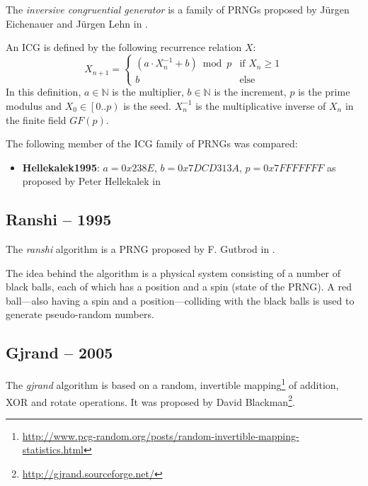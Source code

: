     The \emph{inversive congruential generator} is a family of PRNGs proposed by Jürgen Eichenauer and Jürgen Lehn in \cite{Eichenauer:1986}.

    An ICG is defined by the following recurrence relation $X$:
    \begin{equation*}
        X_{n + 1} = \begin{cases}
                        \left(a \cdot X_n^{-1} + b\right) \bmod p & \text{if } X_n \geq 1 \\
                        b                                         & \text{else}
                    \end{cases}
    \end{equation*}
    In this definition, $a \in \mathbb{N}$ is the multiplier, $b \in \mathbb{N}$ is the increment, $p$ is the prime modulus and $X_0 \in \left[0.. p\right)$ is the seed. $X_n^{-1}$ is the multiplicative inverse of $X_n$ in the finite field $GF\left(p\right)$.

    The following member of the ICG family of PRNGs was compared:
    \begin{itemize}
        \itemsep0em
        \item \textbf{Hellekalek1995}: $a = 0x238E$, $b = 0x7DCD313A$, $p = 0x7FFFFFFF$ as proposed by Peter Hellekalek in \cite{Hellekalek:1995}
    \end{itemize}

\subsection[Ranshi -- 1995]{Ranshi -- 1995} \label{subsec:ranshi}

    The \emph{ranshi} algorithm is a PRNG proposed by F. Gutbrod in \cite{Gutbrod:1995}.

    The idea behind the algorithm is a physical system consisting of a number of black balls, each of which has a position and a spin (state of the PRNG). A red ball---also having a spin and a position---colliding with the black balls is used to generate pseudo-random numbers.

\subsection[Gjrand -- 2005]{Gjrand -- 2005} \label{subsec:gjrand}

    The \emph{gjrand} algorithm is based on a random, invertible mapping\footnote{\url{http://www.pcg-random.org/posts/random-invertible-mapping-statistics.html}} of addition, XOR and rotate operations. It was proposed by David Blackman\footnote{\url{http://gjrand.sourceforge.net/}}.

